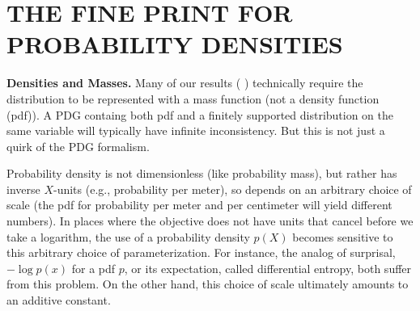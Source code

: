 \documentclass[twoside]{article}
\newif\ifappendix
\theoremstyle{plain}
\newtheorem{remark}{Remark}
\theoremstyle{definition}
\begin{document}
% 
% 
{
\printbibliography[heading=none]
}

\clearpage
\onecolumn
\appendix

\ifappendix
\section{THE FINE PRINT FOR PROBABILITY DENSITIES}
\label{appendix:density}
\textbf{Densities and Masses.} Many of our results (%
)
technically require the distribution to be represented with a mass function (not a density function (pdf)).
A PDG containg both pdf and a finitely supported distribution on the same variable
will typically have infinite inconsistency.
But this is not just a quirk of the PDG formalism.


Probability density is not dimensionless (like probability mass), but rather has inverse $X$-units (e.g., probability per meter), so depends on an arbitrary choice of scale (the pdf for probability per meter and per centimeter will yield different numbers).
In places where the objective does not have units that cancel before we take a logarithm,
the use of a probability density $p(X)$ becomes sensitive to this arbitrary choice of parameterization. For instance, the analog of surprisal, $- \log p(x)$ for a pdf $p$, or its expectation, called differential entropy, both suffer from this problem.
%
On the other hand, this choice of scale ultimately amounts to an additive constant.
\end{document}
